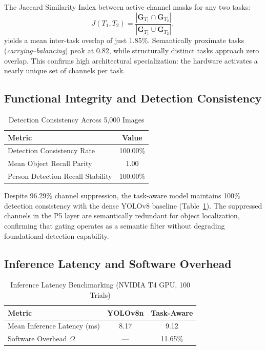 \documentclass[conference]{IEEEtran}
\begin{document}
The Jaccard Similarity Index between active channel masks for any two tasks:
\begin{equation}
    J(T_1, T_2) = \frac{|\mathbf{G}_{T_1} \cap \mathbf{G}_{T_2}|}{|\mathbf{G}_{T_1} \cup \mathbf{G}_{T_2}|},
    \label{eq:jaccard}
\end{equation}
yields a mean inter-task overlap of just 1.85\%. Semantically proximate tasks
(\textit{carrying}--\textit{balancing}) peak at 0.82, while structurally distinct
tasks approach zero overlap. This confirms high architectural specialization: the
hardware activates a nearly unique set of channels per task.

\subsection{Functional Integrity and Detection Consistency}

\begin{table}[htbp]
\caption{Detection Consistency Across 5,000 Images}
\label{tab:consistency}
\begin{center}
\begin{tabular}{lc}
\toprule
\textbf{Metric} & \textbf{Value} \\
\midrule
Detection Consistency Rate & 100.00\% \\
Mean Object Recall Parity & 1.00 \\
Person Detection Recall Stability & 100.00\% \\
\bottomrule
\end{tabular}
\end{center}
\end{table}

Despite 96.29\% channel suppression, the task-aware model maintains 100\%
detection consistency with the dense YOLOv8 baseline (Table~\ref{tab:consistency}).
The suppressed channels in the P5 layer are semantically redundant for object
localization, confirming that gating operates as a semantic filter without
degrading foundational detection capability.

\subsection{Inference Latency and Software Overhead}

\begin{table}[htbp]
\caption{Inference Latency Benchmarking (NVIDIA T4 GPU, 100 Trials)}
\label{tab:latency}
\begin{center}
\begin{tabular}{lcc}
\toprule
\textbf{Metric} & \textbf{YOLOv8n} & \textbf{Task-Aware} \\
\midrule
Mean Inference Latency (ms) & 8.17 & 9.12 \\
Software Overhead $\Omega$ & --- & 11.65\% \\
\bottomrule
\end{tabular}
\end{center}
\end{table}
\end{document}

